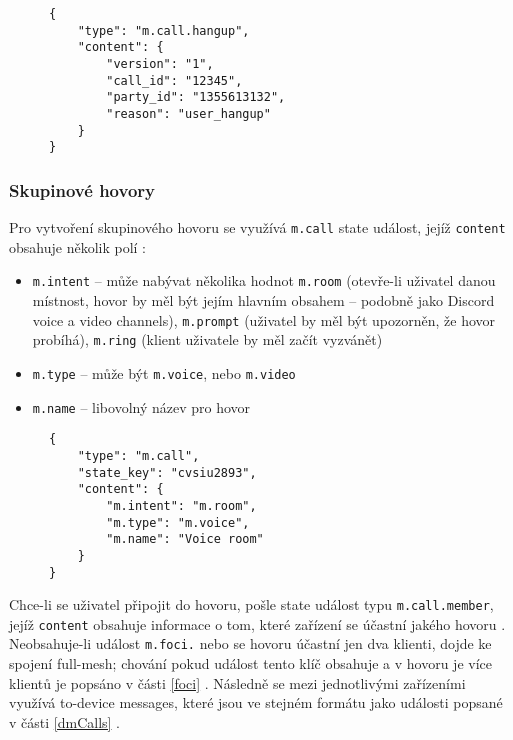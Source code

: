 \begin{figure}[H]
    \begin{verbatim}
{
	"type": "m.call.hangup",
	"content": {
		"version": "1",
		"call_id": "12345",
		"party_id": "1355613132",
		"reason": "user_hangup"
	}
}
	\end{verbatim}
\end{figure}

\subsubsection{Skupinové hovory}

Pro vytvoření skupinového hovoru se využívá \texttt{m.call} state
událost, jejíž \texttt{content} obsahuje několik polí
\parencite{GitHub-MSC3401}:
\begin{itemize}
    \itemsep0em
    \item \texttt{m.intent} -- může nabývat několika hodnot
          \texttt{m.room} (otevře-li uživatel danou místnost, hovor by měl být
          jejím hlavním obsahem -- podobně jako Discord voice a video channels), \texttt{m.prompt} (uživatel by měl být
          upozorněn, že hovor probíhá), \texttt{m.ring} (klient uživatele by
          měl začít vyzvánět)
    \item \texttt{m.type} -- může být \texttt{m.voice}, nebo \texttt{m.video}
    \item \texttt{m.name} -- libovolný název pro hovor
\end{itemize}

\begin{figure}[H]
    \begin{verbatim}
{
	"type": "m.call",
	"state_key": "cvsiu2893",
	"content": {
		"m.intent": "m.room",
		"m.type": "m.voice",
		"m.name": "Voice room"
	}
}
	\end{verbatim}
\end{figure}

Chce-li se uživatel připojit do hovoru, pošle state událost typu
\texttt{m.call.member}, jejíž \texttt{content} obsahuje
informace o tom, které zařízení se účastní jakého hovoru
\parencite{GitHub-MSC3401}. Neobsahuje-li událost \texttt{m.foci.}
nebo se hovoru účastní jen dva klienti, dojde ke spojení full-mesh; chování
pokud událost tento klíč obsahuje a v hovoru je více klientů je popsáno v části
\ref{foci} \parencite{GitHub-MSC3898}. Následně se mezi jednotlivými zařízeními
využívá to-device messages, které jsou ve stejném formátu jako události popsané
v části \ref{dmCalls} \parencite{GitHub-MSC3401}.

